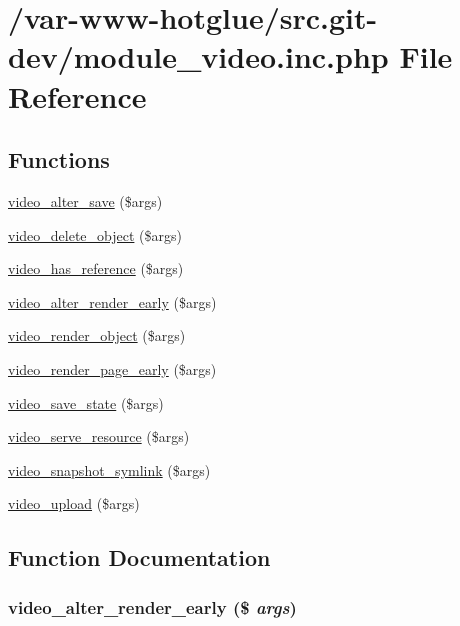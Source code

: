 \hypertarget{module__video_8inc_8php}{
\section{/var-\/www-\/hotglue/src.git-\/dev/module\_\-video.inc.php File Reference}
\label{module__video_8inc_8php}
}
\subsection*{Functions}
\begin{DoxyCompactItemize}
\item 
\hyperlink{module__video_8inc_8php_a0e3433d55c8d20b28c95a757740982e1}{video\_\-alter\_\-save} (\$args)
\item 
\hyperlink{module__video_8inc_8php_a4d25a132251840ed2ade27b636a6694e}{video\_\-delete\_\-object} (\$args)
\item 
\hyperlink{module__video_8inc_8php_adbbede5e492ca7b9457deaf076c887b0}{video\_\-has\_\-reference} (\$args)
\item 
\hyperlink{module__video_8inc_8php_acb94c1f22db7bb3aada14237fa83f4dd}{video\_\-alter\_\-render\_\-early} (\$args)
\item 
\hyperlink{module__video_8inc_8php_a14d6bc200a41905ad201a24d9a2d9be5}{video\_\-render\_\-object} (\$args)
\item 
\hyperlink{module__video_8inc_8php_a223ac9bac4acfb2c9b458b43e45e06e3}{video\_\-render\_\-page\_\-early} (\$args)
\item 
\hyperlink{module__video_8inc_8php_a828b4f740b870b886936a22baf97418e}{video\_\-save\_\-state} (\$args)
\item 
\hyperlink{module__video_8inc_8php_a5af838d3c4206bbc9bc3b5e57b16655c}{video\_\-serve\_\-resource} (\$args)
\item 
\hyperlink{module__video_8inc_8php_a53066561348413ee1021d257ae724983}{video\_\-snapshot\_\-symlink} (\$args)
\item 
\hyperlink{module__video_8inc_8php_a6ab50ffd184d8dcf84a9783dd6a2f80e}{video\_\-upload} (\$args)
\end{DoxyCompactItemize}


\subsection{Function Documentation}
\hypertarget{module__video_8inc_8php_acb94c1f22db7bb3aada14237fa83f4dd}{
\subsubsection[{video\_\-alter\_\-render\_\-early}]{\setlength{\rightskip}{0pt plus 5cm}video\_\-alter\_\-render\_\-early (\$ {\em args})}}
\label{module__video_8inc_8php_acb94c1f22db7bb3aada14237fa83f4dd}



